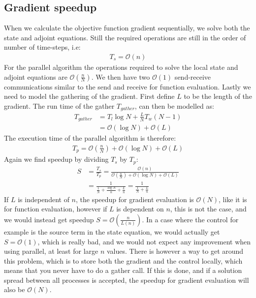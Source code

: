 \subsection{Gradient speedup}
When we calculate the objective function gradient sequentially, we solve both the state and adjoint equations. Still the required operations are still in the order of number of time-steps, i.e:
\begin{align*}
T_s = \mathcal{O}(n)
\end{align*}
For the parallel algorithm the operations required to solve the local state and adjoint equations are $\mathcal{O}(\frac{n}{N})$. We then have two $\mathcal{O}(1)$ send-receive communications similar to the send and receive for function evaluation. Lastly we need to model the gathering of the gradient. First define $L$ to be the length of the gradient. The run time of the gather $T_{gather}$, can then be modelled as:
\begin{align*}
T_{gather} &= T_l\log N + \frac{L}{N}T_w(N-1) \\
&= \mathcal{O}(\log N) + \mathcal{O}(L)
\end{align*}
The execution time of the parallel algorithm is therefore:
\begin{align*}
T_p = \mathcal{O}(\frac{n}{N}) + \mathcal{O}(\log N) + \mathcal{O}(L)
\end{align*}
Again we find speedup by dividing $T_s$ by $T_p$:
\begin{align*}
S &= \frac{T_s}{T_p} = \frac{\mathcal{O}(n)}{\mathcal{O}(\frac{n}{N}) + \mathcal{O}(\log N) + \mathcal{O}(L)} \\
&=\frac{1}{\frac{1}{N} + \frac{\log N}{n}+\frac{L}{n}} = \frac{1}{\frac{1}{N} +\frac{L}{n}}
\end{align*}
If $L$ is independent of $n$, the speedup for gradient evaluation is $\mathcal{O}(N)$, like it is for function evaluation, however if $L$ is dependent on $n$, this is not the case, and we would instead get speedup $S=\mathcal{O}(\frac{n}{L(n)})$. In a case where the control for example is the source term in the state equation, we would actually get $S=\mathcal{O}(1)$, which is really bad, and we would not expect any improvement when using parallel, at least for large $n$ values. There is however a way to get around this problem, which is to store both the gradient and the control locally, which means that you never have to do a gather call. If this is done, and if a solution spread between all processes is accepted, the speedup for gradient evaluation will also be $\mathcal{O}(N)$.
